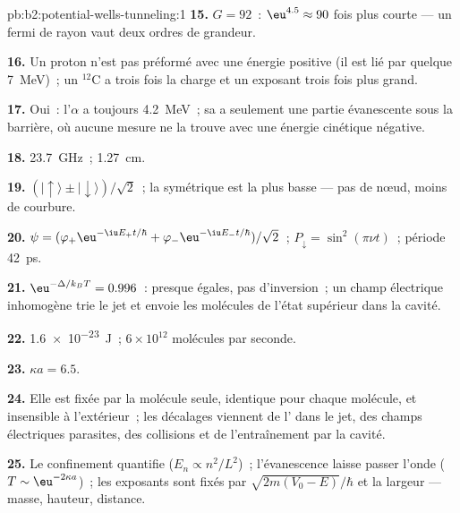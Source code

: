 \begin{solution}{pb:b2:potential-wells-tunneling:1}
\textbf{15.} $G = 92$~: $\eu^{4.5} \approx 90$ fois plus courte --- un fermi de rayon
vaut deux ordres de grandeur.

\textbf{16.} Un proton n'est pas préformé avec une énergie positive (il est
lié par quelque \qty{7}{MeV})~; un $^{12}$C a trois fois la charge et un
exposant trois fois plus grand.

\textbf{17.} Oui~: l'$\alpha$ a toujours \qty{4.2}{MeV}~; sa 
a seulement une partie évanescente sous la barrière, où aucune mesure
ne la trouve avec une énergie cinétique négative.

\textbf{18.} \qty{23.7}{GHz}~; \qty{1.27}{cm}.

\textbf{19.} $(|{\uparrow}\rangle \pm |{\downarrow}\rangle)/\sqrt2$~; la
symétrique est la plus basse --- pas de nœud, moins de courbure.

\textbf{20.} $\psi = (\varphi_+\eu^{-\iu E_+t/\hbar} + \varphi_-\eu^{-\iu E_-t/\hbar})/\sqrt2$~;
$P_{\downarrow} = \sin^2(\pi\nu t)$~; période \qty{42}{ps}.

\textbf{21.} $\eu^{-\Delta/k_BT} = 0.996$~: presque égales, pas d'inversion~; un
champ électrique inhomogène trie le jet et envoie les molécules de l'état
supérieur dans la cavité.

\textbf{22.} \qty{1.6e-23}{J}~; $6 \times 10^{12}$ molécules par seconde.

\textbf{23.} $\kappa a = 6.5$.

\textbf{24.} Elle est fixée par la molécule seule, identique pour chaque
molécule, et insensible à l'extérieur~; les décalages viennent de
l' dans le jet, des champs électriques parasites, des collisions et
de l'entraînement par la cavité.

\textbf{25.} Le confinement quantifie ($E_n \propto n^2/L^2$)~; l'évanescence laisse
passer l'onde ($T \sim \eu^{-2\kappa a}$)~; les exposants sont fixés par
$\sqrt{2m(V_0 - E)}/\hbar$ et la largeur --- masse, hauteur, distance.
\end{solution}
